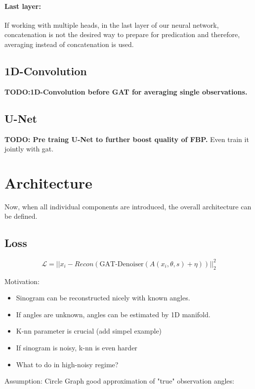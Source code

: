 \paragraph{Last layer:}
If working with multiple heads, in the last layer of our neural network, concatenation is not the desired 
way to prepare for predication and therefore, averaging instead of concatenation is used.


\subsection{1D-Convolution}
\textbf{TODO:1D-Convolution before GAT for averaging single observations.}


\subsection{U-Net}
\textbf{TODO: Pre traing U-Net to further boost quality of FBP.}
Even train it jointly with gat.


\section{Architecture}
Now, when all individual components are introduced, the overall architecture can be defined.



\subsection{Loss}

\begin{equation}
  \mathcal{L} = || x_i - Recon ( \text{GAT-Denoiser}(A(x_i, \theta, s) + \eta)) ||^2_2
\end{equation}



Motivation:
\begin{itemize}
  \item Sinogram can be reconstructed nicely with known angles.
  \item If angles are unknown, angles can be estimated by 1D manifold.
  \item K-nn parameter is crucial (add simpel example)
  \item If sinogram is noisy, k-nn is even harder
  \item What to do in high-noisy regime?
\end{itemize}

Assumption:
Circle Graph good approximation of "true" observation angles:

